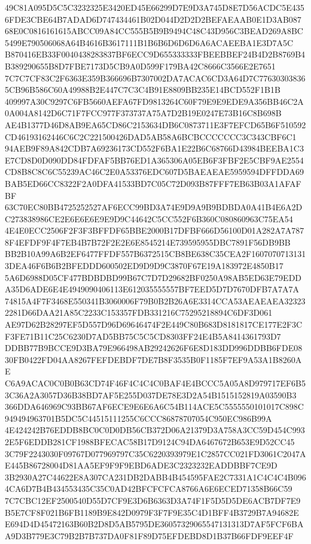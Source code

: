 \documentclass[UTF8,fontset=fandol,zihao=-4,a4paper]{ctexart}
\begin{document}
{{49C81A095D5C5C3232325E3420ED45E66299D7E9D3A745D8E7D56ACDC5E4356FDE3CBE64B7ADAD6D747434461B02D044D2D2D2BEFAEAAB0E1D3AB087
68E0C0816161615ABCC09A84CC555B5B9B9494C48C43D956C3BEAD269A8BC5499E790506068A64B4616B3617111B1B6B6D6D6D6A6ACAEEBA1E3D7A5C
B870416EB33F0040438283837BF6ECC9D655333333FBEEBBEF24B4D2B8769B4B389290655B8D7FBE7173D5CB9A0D599F179BA42C8666C3566E2E7651
7C7C7CF83C2F6363E359B366696B7307002DA7ACAC6CD3A64D7C776303038365CB96B586C60A49988B2E447C7C3C4B91E8809BB235E14BCD552F1B1B
409997A30C9297C6FB5660AEFA67FD9813264C60F79E9E9EDE9A356BB46C2A0A004A8142D6C71F7FCC977F373737A75A7D2B19E0247E73B16C8B698B
AE4B1377D46D8AB9EA65CD86C2153634DB6C0873711E3F7EFCD65B6F510592CD46193162446C6C2C221500426DAD5AB58A6BCBCCCCCCC3C343CBF6C1
94AEB9F89A842CDB7A69236173CD552F6BA1E22B6C68766D43984BEEBA1C3E7CD8D0D090DD84FDFAF5BB76ED1A365306A05EB6F3FBF2E5CBF9AE2554
CD8B8C8C6C55239AC46C2E0A53376EDC607D5BAEAEAE5959594DFFDDA69BAB5ED66CC8322F2A0DFA41533BD7C05C72D093B87FFF7EB63B03A1AFAFBF
63C70EC80BB4725252527AF6ECC99BD3A74E9D9A9B9BDBDA0A41B4E6A2DC273838986CE2E6E6E6E9E9D9C44642C5CC552F6B360C080860963C75EA54
4E4E0ECC2506F2F3F3BFFDF65BBE2000B17DFBF666D56100D01A282A7A7878F4EFDF9F4F7EB4B7B72F2E2E6E8545214E739595955DBC7891F56DB9BB
BB2B10A99A6B2EF6477FFDF557B6372515CB8BE638C35CEA2F16070707131313DEA46F6B6B2BFEDDD600502ED9D9D9C3870F67E19A183972E4850B17
5A6D6988D05CF477BDBDBD99B67C7D7D29682BF0250A98AB5ED63E79EDDA35D6ADE6E4E4949090406113E612035555557BF7EED5D7D7670DFB7A7A7A
74815A4F7F3468E550341B3060006F79B0B2B26A6E3314CCA53AEAEAEA323232281D66DAA21A85C2233C153357FDB331216C75295218894C6DF3D061
AE97D62B28297EF5D557D96D69646474F2E449C80B683D8181817CE177E2F3CF3FE71B11C25C6230D7AD5BB75C5C5CD8303FF24E4B5A8414361793D7
DDBB77B9BCCE9D3BA79E966498AB29242626F6E8D183DD996DDBB6FDE0830FB0422FD04AA8267FEFDEBDF7DE7B8F3535B0F1185F7EF9A53A1B8260AE
C6A9ACAC0C0B0B63CD74F46F4C4C4C0BAF4E4BCCC5A05A8D979717EF6B53C36A2A3057D36B38BD7AF5E255D037DE78E3D2A54B1515152819A03590B3
366DDA646969C93BB67AF6ECE9E6E6A6C54B114ACE5C5555550101017C898C949494963701B5DC5C44515111255C6CCC86878707054C950EC986B99A
4E424242B76EDDB8BC0C0D0DB56CB372D06A21379D3A758A3CC59D454C9932E5F6EDDB281CF1988BFECAC58B17D9124C94DA6467672B653E9D52CC45
3C79F2243030F09767D077969797C35C6220393979E1C2857CC021FD3061C2047AE445B86728004D81AA5EF9F9F9EBD6ADE3C2323232EADDBBF7CE9D
3B2930A27C44622E8A307CA231DB2DABB4B454595FAE2C7331A1C4C4C4B0964CA6D7B4B434553435C35C0AD42BFCFCFCA8766A6E6ECED71358B66C59
7C7CBC12EF2500540D55D7CF9E3D6B6363D3A74F1F5D5D5DE6ACB7DF7E9B5E7CF8F021B6FB1189B9E842D0979F3F7F9E35C4D1BFF4B3729B7A94682E
E694D4D45472163B60B2D8D5AB5795DE36057329065547131313D7AF5FCF6BAA9D3B779E3C79B2B7B737DA0F81F89D75EFDEBD8D1B37B66FDF9EEF4F
}}
\end{document}
